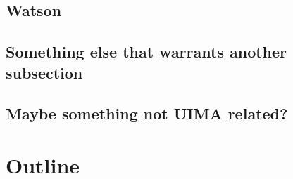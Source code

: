 \subsection{Watson}

\subsection{Something else that warrants another subsection}

\subsection{Maybe something not UIMA related?}


\section{Outline}